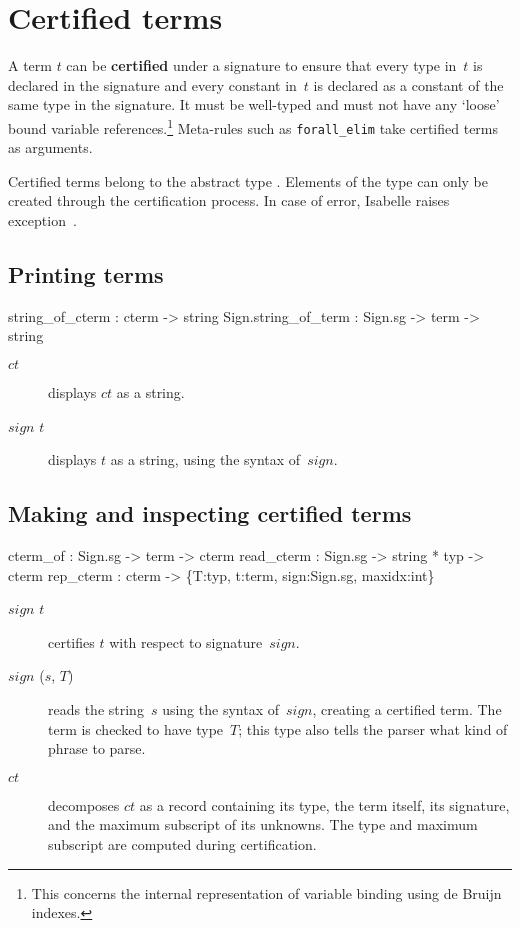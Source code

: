\section{Certified terms}
A term $t$ can be {\bf certified} under a signature to ensure that every
type in~$t$ is declared in the signature and every constant in~$t$ is
declared as a constant of the same type in the signature.  It must be
well-typed and must not have any `loose' bound variable
references.\footnote{This concerns the internal representation of variable
binding using de Bruijn indexes.} Meta-rules such as {\tt forall_elim} take
certified terms as arguments.

Certified terms belong to the abstract type .
Elements of the type can only be created through the certification process.
In case of error, Isabelle raises exception~\@.

\subsection{Printing terms}
\begin{ttbox} 
     string_of_cterm :           cterm -> string
Sign.string_of_term  : Sign.sg -> term -> string
\end{ttbox}
\begin{description}
\item[ $ct$] 
displays $ct$ as a string.

\item[ $sign$ $t$] 
displays $t$ as a string, using the syntax of~$sign$.
\end{description}

\subsection{Making and inspecting certified terms}
\begin{ttbox} 
cterm_of   : Sign.sg -> term -> cterm
read_cterm : Sign.sg -> string * typ -> cterm
rep_cterm  : cterm -> \{T:typ, t:term, sign:Sign.sg, maxidx:int\}
\end{ttbox}
\begin{description}
\item[ $sign$ $t$] 
certifies $t$ with respect to signature~$sign$.

\item[ $sign$ ($s$, $T$)] 
reads the string~$s$ using the syntax of~$sign$, creating a certified term.
The term is checked to have type~$T$; this type also tells the parser what
kind of phrase to parse.

\item[ $ct$] 
decomposes $ct$ as a record containing its type, the term itself, its
signature, and the maximum subscript of its unknowns.  The type and maximum
subscript are computed during certification.
\end{description}


